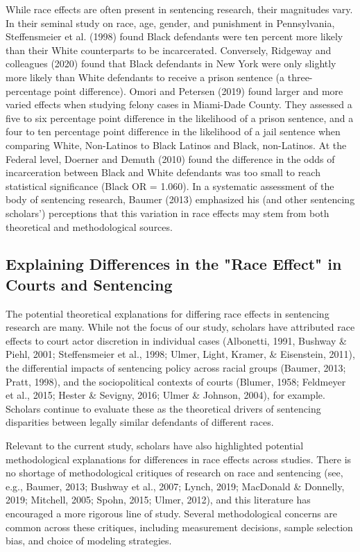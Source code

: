 \documentclass[titlepage]{article}
\begin{document}
While race effects are often present in sentencing research, their magnitudes vary. In their seminal study on race, age, gender, and punishment in Pennsylvania, Steffensmeier et al. (1998) found Black defendants were ten percent more likely than their White counterparts to be incarcerated. Conversely, Ridgeway and colleagues (2020) found that Black defendants in New York were only slightly more likely than White defendants to receive a prison sentence (a three-percentage point difference). Omori and Petersen (2019) found larger and more varied effects when studying felony cases in Miami-Dade County. They assessed a five to six percentage point difference in the likelihood of a prison sentence, and a four to ten percentage point difference in the likelihood of a jail sentence when comparing White, Non-Latinos to Black Latinos and Black, non-Latinos. At the Federal level, Doerner and Demuth (2010) found the difference in the odds of incarceration between Black and White defendants was too small to reach statistical significance (Black OR = 1.060). In a systematic assessment of the body of sentencing research, Baumer (2013) emphasized his (and other sentencing scholars’) perceptions that this variation in race effects may stem from both theoretical and methodological sources.

\subsection{Explaining Differences in the "Race Effect" in Courts and Sentencing}

The potential theoretical explanations for differing race effects in sentencing research are many. While not the focus of our study, scholars have attributed race effects to court actor discretion in individual cases (Albonetti, 1991, Bushway \& Piehl, 2001; Steffensmeier et al., 1998; Ulmer, Light, Kramer, \& Eisenstein, 2011), the differential impacts of sentencing policy across racial groups (Baumer, 2013; Pratt, 1998), and the sociopolitical contexts of courts (Blumer, 1958; Feldmeyer et al., 2015; Hester \& Sevigny, 2016; Ulmer \& Johnson, 2004), for example. Scholars continue to evaluate these as the theoretical drivers of sentencing disparities between legally similar defendants of different races.

Relevant to the current study, scholars have also highlighted potential methodological explanations for differences in race effects across studies. There is no shortage of methodological critiques of research on race and sentencing (see, e.g., Baumer, 2013; Bushway et al., 2007; Lynch, 2019; MacDonald \& Donnelly, 2019; Mitchell, 2005; Spohn, 2015; Ulmer, 2012), and this literature has encouraged a more rigorous line of study. Several methodological concerns are common across these critiques, including measurement decisions, sample selection bias, and choice of modeling strategies.
\end{document}
